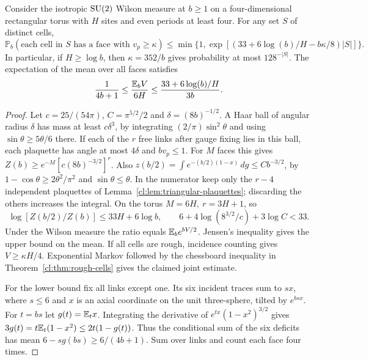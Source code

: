 \begin{theorem}\label{cl:thm:natural-rough-cells}
Consider the isotropic \(\mathrm{SU}(2)\) Wilson measure at \(b\ge1\) on a
four-dimensional rectangular torus with \(H\) sites and even periods
at least four. For any set \(S\) of distinct cells,
\[
 \mathbb P_b(\text{each cell in }S\text{ has a face with }v_p\ge\kappa)
 \le \min\{1,\exp[(33+6\log(b)/H-b\kappa/8)|S|]\}.
\]
In particular, if \(H\ge\log b\), then \(\kappa=352/b\) gives probability
at most \(128^{-|S|}\). The expectation of the mean over all faces satisfies
\[
 \frac1{4b+1}\le\frac{\mathbb{E}_b V}{6H}
       \le\frac{33+6\log(b)/H}{3b}.
\]
\end{theorem}
\begin{proof}
Let \(c=25/(54\pi)\), \(C=\pi^{5/2}/2\) and \(\delta=(8b)^{-1/2}\).
A Haar ball of angular radius \(\delta\) has mass at least \(c\delta^3\),
by integrating \((2/\pi)\sin^2\theta\) and using
\(\sin\theta\ge5\theta/6\) there. If each of the \(r\) free links
after gauge fixing lies in this ball, each plaquette has angle at most
\(4\delta\) and \(bv_p\le1\). For \(M\) faces this gives
\(Z(b)\ge e^{-M}[c(8b)^{-3/2}]^r\).
Also \(z(b/2)=\int e^{-(b/2)(1-x)}\,dg\le C b^{-3/2}\), by
\(1-\cos\theta\ge2\theta^2/\pi^2\) and \(\sin\theta\le\theta\).
In the numerator keep only the \(r-4\) independent plaquettes of
Lemma~\ref{cl:lem:triangular-plaquettes}; discarding the others increases
the integral. On the torus \(M=6H,\ r=3H+1\), so
\[
 \log[Z(b/2)/Z(b)]\le33H+6\log b ,
 \qquad 6+4\log(8^{3/2}/c)+3\log C<33.
\]
Under the Wilson measure the ratio equals \(\mathbb{E}_b e^{bV/2}\).
Jensen's inequality gives the upper bound on the mean. If all cells
are rough, incidence counting gives \(V\ge\kappa H/4\).
Exponential Markov followed by the chessboard inequality in
Theorem~\ref{cl:thm:rough-cells} gives the claimed joint estimate.

For the lower bound fix all links except one. Its six incident traces
sum to \(s x\), where \(s\le6\) and \(x\) is an axial coordinate on
the unit three-sphere, tilted by \(e^{bsx}\). For \(t=bs\) let
\(g(t)=\mathbb{E}_t x\). Integrating the derivative of
\(e^{tx}(1-x^2)^{3/2}\) gives \(3g(t)=t\mathbb{E}_t(1-x^2)\le2t(1-g(t))\).
Thus the conditional sum of the six deficits has mean
\(6-sg(bs)\ge6/(4b+1)\). Sum over links and count each face four times.
\end{proof}

